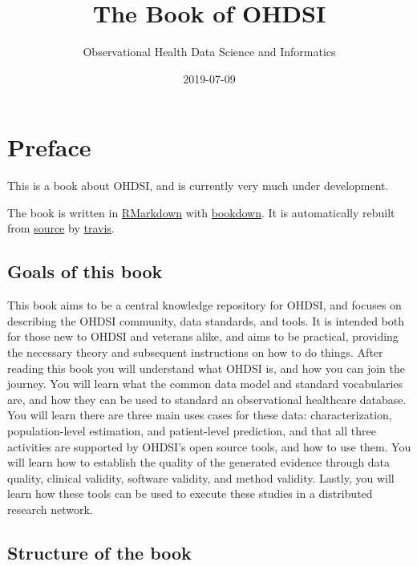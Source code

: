 \documentclass[11pt]{book}
\title{The Book of OHDSI}
\author{Observational Health Data Science and Informatics}
\date{2019-07-09}
\theoremstyle{definition}
\theoremstyle{definition}
\theoremstyle{definition}
\theoremstyle{remark}
\begin{document}
\maketitle

{
\setcounter{tocdepth}{1}
\tableofcontents
}
\hypertarget{preface}{%
\chapter*{Preface}\label{preface}}

This is a book about OHDSI, and is currently very much under development.

The book is written in \href{https://rmarkdown.rstudio.com}{RMarkdown} with \href{https://bookdown.org}{bookdown}. It is automatically rebuilt from \href{https://github.com/OHDSI/TheBookOfOhdsi}{source} by \href{http://travis-ci.org/}{travis}.

\hypertarget{goals-of-this-book}{%
\section*{Goals of this book}\label{goals-of-this-book}}

This book aims to be a central knowledge repository for OHDSI, and focuses on describing the OHDSI community, data standards, and tools. It is intended both for those new to OHDSI and veterans alike, and aims to be practical, providing the necessary theory and subsequent instructions on how to do things. After reading this book you will understand what OHDSI is, and how you can join the journey. You will learn what the common data model and standard vocabularies are, and how they can be used to standard an observational healthcare database. You will learn there are three main uses cases for these data: characterization, population-level estimation, and patient-level prediction, and that all three activities are supported by OHDSI's open source tools, and how to use them. You will learn how to establish the quality of the generated evidence through data quality, clinical validity, software validity, and method validity. Lastly, you will learn how these tools can be used to execute these studies in a distributed research network.

\hypertarget{structure-of-the-book}{%
\section*{Structure of the book}\label{structure-of-the-book}}
\end{document}
